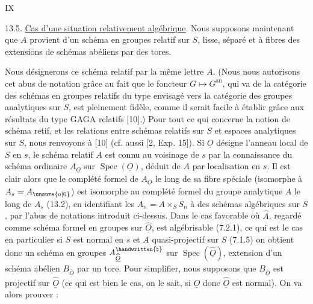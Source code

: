 

IX

13.5. \uline{Cas d'une situation relativement algébrique}. Nous supposons maintenant que $A$ provient d'un schéma en groupes relatif sur $S$, lisse, séparé et à fibres des extensions de schémas abéliens par des tores.

Nous désignerons ce schéma relatif par la même lettre $A$. (Nous nous autorisons cet abus de notation grâce au fait que le foncteur $G\mapsto G^{\mathrm{an}}$, qui va de la catégorie des schémas en groupes relatifs du type envisagé vers la catégorie des groupes analytiques sur $S$, est pleinement fidèle, comme il serait facile à établir grâce aux résultats du type GAGA relatifs [10].) Pour tout ce qui concerne la notion de schéma retif, et les relations entre schémas relatifs sur $S$ et espaces analytiques sur $S$, nous renvoyons à [10] (cf. aussi [2, Exp. 15]). Si $\underline O$ désigne l'anneau local de $S$ en $s$, le schéma relatif $A$ est connu au voisinage de $s$ par la connaissance du schéma ordinaire $A_{\underline O}$ sur $\operatorname{Spec}(\underline O)$, déduit de $A$ par localisation en $s$. Il est clair alors que le complété formel de $A_{\underline O}$ le long de sa fibre spéciale (isomorphe à $A_s=A_{\unsure{o|0}}$) est isomorphe au complété formel du groupe analytique $A$ le long de $A_s$ (13.2), en identifiant les $A_n=A\times_S S_n$ à des schémas algébriques sur $S$, par l'abus de notations introduit ci-dessus. Dans le cas favorable où $\widehat A$, regardé comme schéma formel en groupes sur $\widehat{\underline O}$, est algébrisable (7.2.1), ce qui est le cas en particulier si $S$ est normal en $s$ et $A$ quasi-projectif sur $S$ (7.1.5) on obtient donc un schéma en groupes $A^{\handwritten{\natural}}_{\widehat{\underline O}}$ sur $\operatorname{Spec}(\widehat{\underline O})$, extension d'un schéma abélien $B_{\widehat{\underline O}}$ par un tore. Pour simplifier, nous supposons que $B_{\widehat{\underline O}}$ est projectif sur $\widehat{\underline O}$ (ce qui est bien le cas, on le sait, si $\underline O$ donc $\widehat{\underline O}$ est normal). On va alors prouver :




